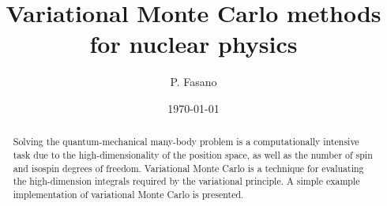 \documentclass[aps,prl,preprint,groupedaddress]{revtex4-1}
\begin{document}

\title{Variational Monte Carlo methods for nuclear physics}


\author{P. Fasano}


\date{\today}

\begin{abstract}
Solving the quantum-mechanical many-body problem is a computationally intensive
task due to the high-dimensionality of the position space, as well as the number
of spin and isospin degrees of freedom. Variational Monte Carlo is a technique
for evaluating the high-dimension integrals required by the variational principle.
A simple example implementation of variational Monte Carlo is presented.
\end{abstract}

\pacs{}

\maketitle
\end{document}
